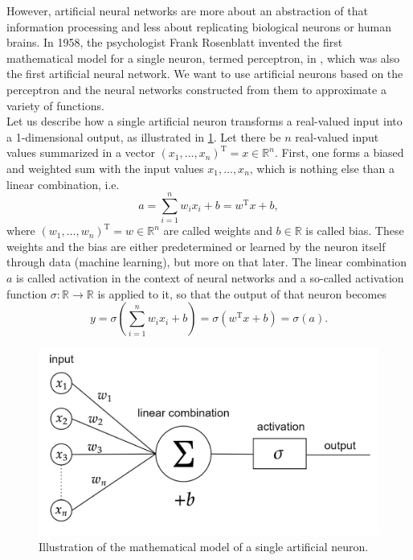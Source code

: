 However, artificial neural networks are more about an abstraction of that information processing and less about replicating biological neurons or human brains. In 1958, the psychologist Frank Rosenblatt invented the first mathematical model for a single neuron, termed perceptron, in \cite{Rosenblatt:1958}, which was also the first artificial neural network. We want to use artificial neurons based on the perceptron and the neural networks constructed from them to approximate a variety of functions. \\
Let us describe how a single artificial neuron transforms a real-valued input into a 1-dimensional output, as illustrated in \cref{fig4}. Let there be $n$ real-valued input values summarized in a vector $(x_1, \ldots, x_n)^{\mathrm{T}} = x \in \mathbb{R}^n$. First, one forms a biased and weighted sum with the input values $x_1, \ldots, x_n$, which is nothing else than a linear combination, i.e. 
\begin{equation*}
    a = \sum^{n}_{i=1} w_i x_i + b = w^{\mathrm{T}} x + b,
\end{equation*}
where $(w_1, \ldots, w_n)^{\mathrm{T}} = w \in \mathbb{R}^n$ are called weights and $b \in \mathbb{R}$ is called bias. These weights and the bias are either predetermined or learned by the neuron itself through data (machine learning), but more on that later. The linear combination $a$ is called activation in the context of neural networks and a so-called activation function $\sigma \colon \mathbb{R} \to \mathbb{R}$ is applied to it, so that the output of that neuron becomes
\begin{equation*}
    y = \sigma \left( \sum^{n}_{i=1} w_i x_i + b \right) = \sigma \left( w^{\mathrm{T}} x + b \right) = \sigma(a).
\end{equation*}

\begin{figure}[H]
    \begin{center}
        \includegraphics[scale=0.25]{img/diagram-20220205_1.png}
    \end{center}
    \caption{Illustration of the mathematical model of a single artificial neuron.}
    \label{fig4}
\end{figure}

